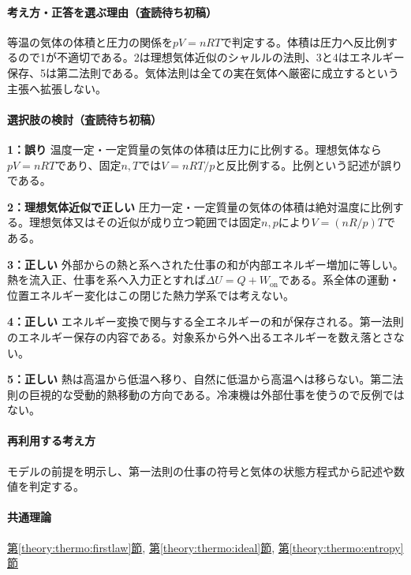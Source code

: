 \paragraph{考え方・正答を選ぶ理由（査読待ち初稿）} 等温の気体の体積と圧力の関係を\(pV=nRT\)で判定する。体積は圧力へ反比例するので1が不適切である。2は理想気体近似のシャルルの法則、3と4はエネルギー保存、5は第二法則である。気体法則は全ての実在気体へ厳密に成立するという主張へ拡張しない。

\paragraph{選択肢の検討（査読待ち初稿）}\mbox{}\par

\noindent\textbf{1：誤り} 温度一定・一定質量の気体の体積は圧力に比例する。理想気体なら\(pV=nRT\)であり、固定\(n,T\)では\(V=nRT/p\)と反比例する。比例という記述が誤りである。\par

\noindent\textbf{2：理想気体近似で正しい} 圧力一定・一定質量の気体の体積は絶対温度に比例する。理想気体又はその近似が成り立つ範囲では固定\(n,p\)により\(V=(nR/p)T\)である。\par

\noindent\textbf{3：正しい} 外部からの熱と系へされた仕事の和が内部エネルギー増加に等しい。熱を流入正、仕事を系へ入力正とすれば\(\Delta U=Q+W_{\mathrm{on}}\)である。系全体の運動・位置エネルギー変化はこの閉じた熱力学系では考えない。\par

\noindent\textbf{4：正しい} エネルギー変換で関与する全エネルギーの和が保存される。第一法則のエネルギー保存の内容である。対象系から外へ出るエネルギーを数え落とさない。\par

\noindent\textbf{5：正しい} 熱は高温から低温へ移り、自然に低温から高温へは移らない。第二法則の巨視的な受動的熱移動の方向である。冷凍機は外部仕事を使うので反例ではない。\par

\paragraph{再利用する考え方} モデルの前提を明示し、第一法則の仕事の符号と気体の状態方程式から記述や数値を判定する。

\paragraph{共通理論} \hyperref[theory:thermo:firstlaw]{第\ref*{theory:thermo:firstlaw}節}, \hyperref[theory:thermo:ideal]{第\ref*{theory:thermo:ideal}節}, \hyperref[theory:thermo:entropy]{第\ref*{theory:thermo:entropy}節}

